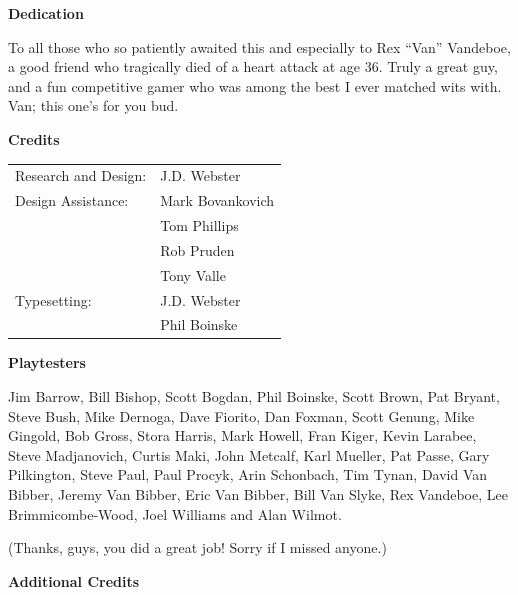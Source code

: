 \begin{center}
\textbf{\Large Dedication}
\end{center}

To all those who so patiently awaited this and especially to Rex “Van” Vandeboe, a good friend who tragically died of a heart attack at age 36. Truly a great guy, and a fun competitive gamer who was among the best I ever matched wits with. Van; this one’s for you bud.

\begin{center}
\textbf{\Large Credits}
\end{center}

\begin{tabularx}{\linewidth}{@{}LL@{}}
Research and Design: &J.D. Webster\\
Design Assistance:   &Mark Bovankovich\\
                     &Tom Phillips\\
                     &Rob Pruden\\
                     &Tony Valle\\
Typesetting:         &J.D. Webster\\
                     &Phil Boinske\\
\end{tabularx}

\begin{center}
\textbf{\Large Playtesters}
\end{center}

Jim Barrow, Bill Bishop, Scott Bogdan, Phil Boinske, Scott Brown, Pat Bryant, Steve Bush, Mike Dernoga, Dave Fiorito, Dan Foxman, Scott Genung, Mike Gingold, Bob Gross, Stora Harris, Mark Howell, Fran Kiger, Kevin Larabee, Steve Madjanovich, Curtis Maki, John Metcalf, Karl Mueller, Pat Passe, Gary Pilkington, Steve Paul, Paul Procyk, Arin Schonbach, Tim Tynan, David Van Bibber, Jeremy Van Bibber, Eric Van Bibber, Bill Van Slyke, Rex Vandeboe, Lee Brimmicombe-Wood, Joel Williams and Alan Wilmot.

(Thanks, guys, you did a great job! Sorry if I missed anyone.)

\newpage

\begin{center}
\textbf{\Large Additional Credits}
\end{center}

